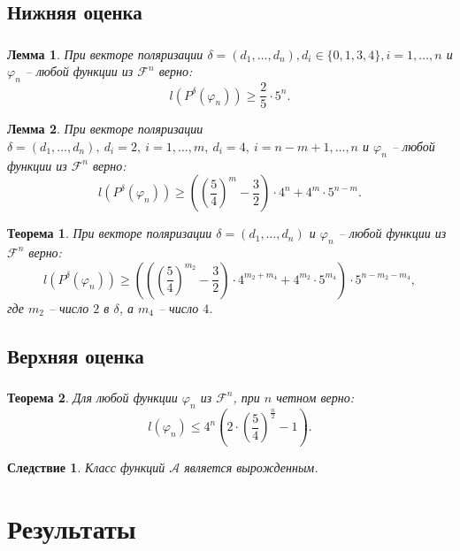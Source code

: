 \documentclass[t]{beamer}
\newtheorem{myth}{Теорема}
\newtheorem{mylm}{Лемма}
\newtheorem*{myco}{Следствие}
\newcommand{\pphi}[1] {P^{\delta}(\varphi_{#1})}
\begin{document}
\subsection{Нижняя оценка}
\begin{frame}
\frametitle{\insertsection}
\framesubtitle{\insertsubsection}
 {
\begin{mylm}
При векторе поляризации $\delta = (d_1,\dots,d_n), d_i \in \{0,1,3,4\}, i = 1,\dots,n$ и
$\varphi_n$ -- любой функции из $\mathcal{F}^n$ верно:
$$l(\pphi{n}) \geqslant \frac{2}{5} \cdot 5^n.$$
\end{mylm}
\begin{mylm}
\label{lm24l}
При векторе поляризации $\delta=(d_1,\dots,d_n),\ d_i = 2,\ i=1,\dots,m,\ d_i=4,{\ i=n-m+1,\dots,n}$
и $\varphi_n$ -- любой функции из $\mathcal{F}^n$ верно:
$$l(\pphi{n})\geqslant\left(\left(\frac{5}{4}\right)^m-\frac{3}{2}\right)\cdot4^n+4^m\cdot5^{n-m}.$$
\end{mylm}
}
 {
\begin{myth}
При векторе поляризации $\delta=(d_1,\dots,d_n)$ и $\varphi_n$ -- любой функции из
$\mathcal{F}^n$ верно: $$l(\pphi{n}) \geqslant \left(\left(\left(\frac{5}{4}\right)^{m_2}-
\frac{3}{2}\right) \cdot 4^{m_2+m_4}+4^{m_2}\cdot 5^{m_4} \right) \cdot 5^{n-m_2-m_4},$$
где $m_2$ -- число $2$ в $\delta$, а $m_4$ -- число $4$.
\end{myth}
}
\end{frame}

\subsection{Верхняя оценка}
\begin{frame}
\frametitle{\insertsection}
\framesubtitle{\insertsubsection}
\begin{myth}
\label{thh}
Для любой функции $\varphi_n$ из $\mathcal{F}^n$, при $n$ четном верно:
$$ l(\varphi_n) \leqslant 4^n\left( 2 \cdot \left (\frac{5}{4} \right)^{\frac{n}{2}} - 1 \right).$$
\end{myth}
\begin{myco}
Класс функций $\mathcal{A}$ является вырожденным.
\end{myco}
\end{frame}

\section{Результаты}
\end{document}
